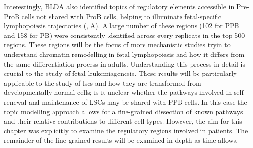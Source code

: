 Interestingly, BLDA also identified topics of regulatory elements accessible in Pre-ProB cells not shared with ProB cells, helping to illuminate fetal-specific lymphopoiesis trajectories (, A). A large number of these regions (102 for PPB and 158 for PB) were consistently identified across every replicate in the top 500 regions. These regions will be the focus of more mechanistic studies tryin to understand chromatin remodelling in fetal lymphopoiesis and how it differs from the same differentiation process in adults. Understanding this process in detail is crucial to the study of fetal leukemiagenesis. These results will be particularly applicable to the study of \glspl{lsc} and how they are transformed from developmentally normal cells; is it unclear whether the pathways involved in self-renewal and maintenance of LSCs may be shared with PPB cells. In this case the topic modelling approach allows for a fine-grained dissection of known pathways and their relative contributions to different cell types. However, the aim for this chapter was explicitly to examine the regulatory regions involved in patients. The remainder of the fine-grained results will be examined in depth as time allows. 

